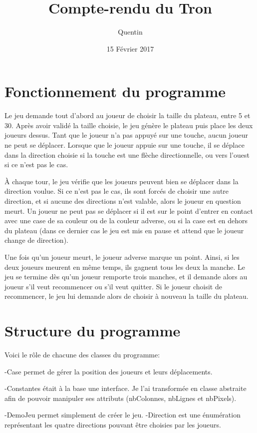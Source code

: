 \documentclass{report}
\title{Compte-rendu du Tron}
\author{Quentin \bsc{SAUVAGE}}
\date{15 Février 2017}
\begin{document}
\maketitle
\chapter{Fonctionnement du programme}
Le jeu demande tout d'abord au joueur de choisir la taille du plateau, entre 5 et 30. Après avoir validé la taille choisie, le jeu génère le plateau puis place les deux joueurs dessus. Tant que le joueur n'a pas appuyé sur une touche, aucun joueur ne peut se déplacer. Lorsque que le joueur appuie sur une touche, il se déplace dans la direction choisie si la touche est une flèche directionnelle, ou vers l'ouest si ce n'est pas le cas.

À chaque tour, le jeu vérifie que les joueurs peuvent bien se déplacer dans la direction voulue. Si ce n'est pas le cas, ils sont forcés de choisir une autre direction, et si aucune des directions n'est valable, alors le joueur en question meurt.
Un joueur ne peut pas se déplacer si il est sur le point d'entrer en contact avec une case de sa couleur ou de la couleur adverse, ou si la case est en dehors du plateau (dans ce dernier cas le jeu est mis en pause et attend que le joueur change de direction).

Une fois qu'un joueur meurt, le joueur adverse marque un point. Ainsi, si les deux joueurs meurent en même temps, ils gagnent tous les deux la manche. Le jeu se termine dès qu'un joueur remporte trois manches, et il demande alors au joueur s'il veut recommencer ou s'il veut quitter.
Si le joueur choisit de recommencer, le jeu lui demande alors de choisir à nouveau la taille du plateau.

\chapter{Structure du programme}

Voici le rôle de chacune des classes du programme:

-Case permet de gérer la position des joueurs et leurs déplacements.

-Constantes était à la base une interface. Je l'ai transformée en classe abstraite afin de pouvoir manipuler ses attributs (nbColonnes, nbLignes et nbPixels).

-DemoJeu permet simplement de créer le jeu.
-Direction est une énumération représentant les quatre directions pouvant être choisies par les joueurs.
\end{document}
